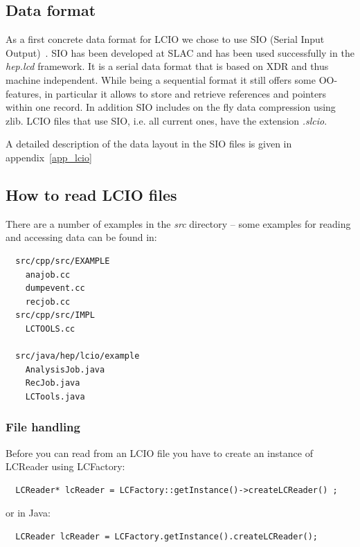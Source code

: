 \documentclass[twoside]{article}
\begin{document}
\subsection{Data format \label{sec_sio}}

As a first concrete data format for LCIO we chose to use SIO (Serial Input Output)~\cite{sio_doc}.
SIO has been developed at SLAC and has been used successfully in the {\em hep.lcd}
framework. It is a serial data format that is based on XDR and thus machine 
independent. While being a sequential format it still offers some OO-features, in 
particular it allows to store and retrieve references and pointers within one record.
In addition SIO includes on the fly data compression using zlib.
LCIO files that use SIO, i.e. all current ones, have the extension {\em .slcio}.

A detailed description of the data layout in the SIO files is given in appendix~\ref{app_lcio}


\subsection{How to read LCIO files} \label{examples} 
There are a number of examples in the {\em src} directory -- 
some examples for reading and accessing data can be found in:
\begin{verbatim}
  src/cpp/src/EXAMPLE
    anajob.cc
    dumpevent.cc
    recjob.cc
  src/cpp/src/IMPL
    LCTOOLS.cc

  src/java/hep/lcio/example
    AnalysisJob.java
    RecJob.java
    LCTools.java
\end{verbatim}

\subsubsection{File handling} 
Before you can read from an LCIO file you have to create an instance of LCReader using LCFactory:

\begin{verbatim}
  LCReader* lcReader = LCFactory::getInstance()->createLCReader() ;
\end{verbatim}
or in Java:
\begin{verbatim}
  LCReader lcReader = LCFactory.getInstance().createLCReader();
\end{verbatim}
\end{document}
